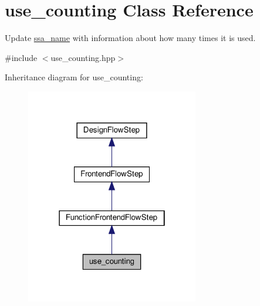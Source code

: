 \hypertarget{classuse__counting}{}\section{use\+\_\+counting Class Reference}
\label{classuse__counting}


Update \hyperlink{structssa__name}{ssa\+\_\+name} with information about how many times it is used.  




{\ttfamily \#include $<$use\+\_\+counting.\+hpp$>$}



Inheritance diagram for use\+\_\+counting\+:
\nopagebreak
\begin{figure}[H]
\begin{center}
\leavevmode
\includegraphics[width=214pt]{d9/dce/classuse__counting__inherit__graph}
\end{center}
\end{figure}


